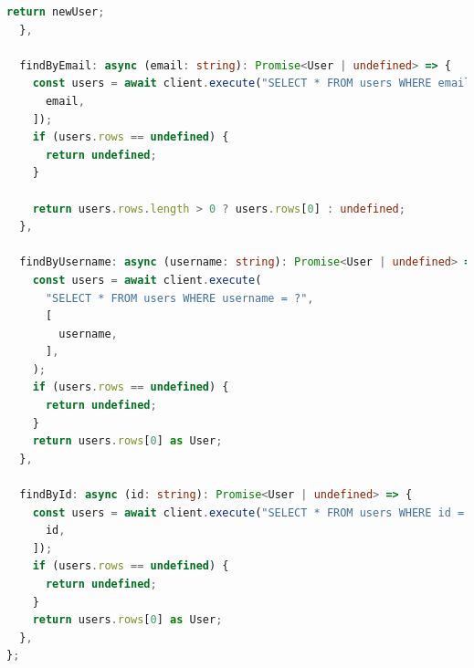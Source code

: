 \documentclass[12pt,a4paper]{report}
\begin{document}
\begin{lstlisting}[language=TypeScript]
    return newUser;
  },

  findByEmail: async (email: string): Promise<User | undefined> => {
    const users = await client.execute("SELECT * FROM users WHERE email = ?", [
      email,
    ]);
    if (users.rows == undefined) {
      return undefined;
    }

    return users.rows.length > 0 ? users.rows[0] : undefined;
  },

  findByUsername: async (username: string): Promise<User | undefined> => {
    const users = await client.execute(
      "SELECT * FROM users WHERE username = ?",
      [
        username,
      ],
    );
    if (users.rows == undefined) {
      return undefined;
    }
    return users.rows[0] as User;
  },

  findById: async (id: string): Promise<User | undefined> => {
    const users = await client.execute("SELECT * FROM users WHERE id = ?", [
      id,
    ]);
    if (users.rows == undefined) {
      return undefined;
    }
    return users.rows[0] as User;
  },
};
\end{lstlisting}
\end{document}
